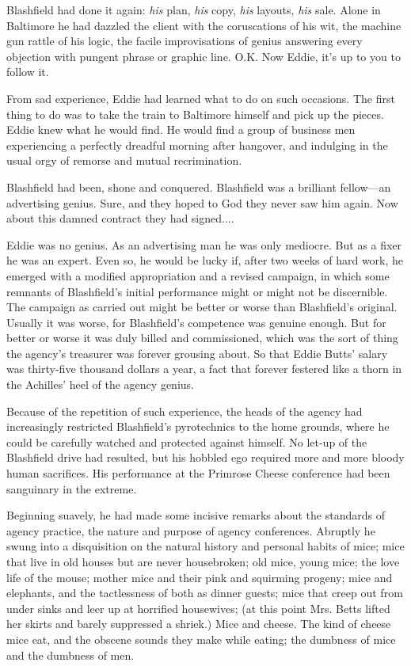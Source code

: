 \documentclass[openany,nobib]{tufte-book}
\begin{document}
Blashfield had done it again: \emph{his} plan, \emph{his} copy,
\emph{his} layouts, \emph{his} sale. Alone in Baltimore he had dazzled
the client with the coruscations of his wit, the machine gun rattle of
his logic, the facile improvisations of genius answering every objection
with pungent phrase or graphic line. O.K. Now Eddie, it's up to you to
follow it.

From sad experience, Eddie had learned what to do on such occasions. The
first thing to do was to take the train to Baltimore himself and pick up
the pieces. Eddie knew what he would find. He would find a group of
business men experiencing a perfectly dreadful morning after hangover,
and indulging in the usual orgy of remorse and mutual recrimination.

Blashfield had been, shone and conquered. Blashfield was a brilliant
fellow---an advertising genius. Sure, and they hoped to God they never
saw him again. Now about this damned contract they had signed....

Eddie was no genius. As an advertising man he was only mediocre. But as
a fixer he was an expert. Even so, he would be lucky if, after two weeks
of hard work, he emerged with a modified appropriation and a revised
campaign, in which some remnants of Blashfield's initial performance
might or might not be discernible. The campaign as carried out might be
better or worse than Blashfield's original. Usually it was worse, for
Blashfield's competence was genuine enough. But for better or worse it
was duly billed and commissioned, which was the sort of thing the
agency's treasurer was forever grousing about. So that Eddie Butts'
salary was thirty-five thousand dollars a year, a fact that forever
festered like a thorn in the Achilles' heel of the agency genius.

Because of the repetition of such experience, the heads of the agency
had increasingly restricted Blashfield's pyrotechnics to the home
grounds, where he could be carefully watched and protected against
himself. No let-up of the Blashfield drive had resulted, but his hobbled
ego required more and more bloody human sacrifices. His performance at
the Primrose Cheese conference had been sanguinary in the extreme.

Beginning suavely, he had made some incisive remarks about the standards
of agency practice, the nature and purpose of agency conferences.
Abruptly he swung into a disquisition on the natural history and
personal habits of mice; mice that live in old houses but are never
housebroken; old mice, young mice; the love life of the mouse; mother
mice and their pink and squirming progeny; mice and elephants, and the
tactlessness of both as dinner guests; mice that creep out from under
sinks and leer up at horrified housewives; (at this point Mrs. Betts
lifted her skirts and barely suppressed a shriek.) Mice and cheese. The
kind of cheese mice eat, and the obscene sounds they make while eating;
the dumbness of mice and the dumbness of men.
\end{document}
